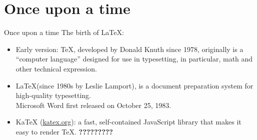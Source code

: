 \section{Once upon a time}

\begin{frame}{Once upon a time}
The birth of \LaTeX:
    \begin{itemize}
        \item Early version: \TeX, developed by Donald Knuth since 1978, originally is a ``computer language'' designed for use in typesetting, in particular, math and other technical expression.
        \pause
        \item \LaTeX (since 1980s by Leslie Lamport), is a document preparation system for high-quality typesetting. \\
        Microsoft Word first released on October 25, 1983.
        \pause
        \item KaTeX (\href{https://katex.org/}{katex.org}): a fast, self-contained JavaScript library that makes it easy to render TeX. {\Huge \color{red}\textbf{?????????}}
    \end{itemize}
    
\end{frame}



